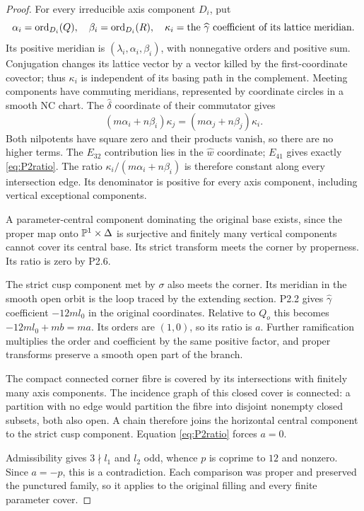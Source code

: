 \begin{proof}
For every irreducible axis component $D_i$, put
\[
 \alpha_i=\operatorname{ord}_{D_i}(Q),\quad\beta_i=\operatorname{ord}_{D_i}(R),\quad
 \kappa_i=\text{the }\widehat\gamma\text{ coefficient of its lattice meridian}.
\]
Its positive meridian is $(\lambda_i,\alpha_i,\beta_i)$, with nonnegative orders and positive sum. Conjugation changes its lattice vector by a vector killed by the first-coordinate covector; thus $\kappa_i$ is independent of its basing path in the complement. Meeting components have commuting meridians, represented by coordinate circles in a smooth NC chart. The $\widehat\delta$ coordinate of their commutator gives
\begin{equation}\label{eq:P2ratio}
 (m\alpha_i+n\beta_i)\kappa_j=(m\alpha_j+n\beta_j)\kappa_i.
\end{equation}
Both nilpotents have square zero and their products vanish, so there are no higher terms. The $E_{32}$ contribution lies in the $\widehat w$ coordinate; $E_{41}$ gives exactly \eqref{eq:P2ratio}. The ratio $\kappa_i/(m\alpha_i+n\beta_i)$ is therefore constant along every intersection edge. Its denominator is positive for every axis component, including vertical exceptional components.

A parameter-central component dominating the original base exists, since the proper map onto $\mathbb P^1\times\Delta$ is surjective and finitely many vertical components cannot cover its central base. Its strict transform meets the corner by properness. Its ratio is zero by P2.6.

The strict cusp component met by $\sigma$ also meets the corner. Its meridian in the smooth open orbit is the loop traced by the extending section. P2.2 gives $\widehat\gamma$ coefficient $-12ml_0$ in the original coordinates. Relative to $Q_o$ this becomes $-12ml_0+mb=ma$. Its orders are $(1,0)$, so its ratio is $a$. Further ramification multiplies the order and coefficient by the same positive factor, and proper transforms preserve a smooth open part of the branch.

The compact connected corner fibre is covered by its intersections with finitely many axis components. The incidence graph of this closed cover is connected: a partition with no edge would partition the fibre into disjoint nonempty closed subsets, both also open. A chain therefore joins the horizontal central component to the strict cusp component. Equation \eqref{eq:P2ratio} forces $a=0$.

Admissibility gives $3\nmid l_1$ and $l_2$ odd, whence $p$ is coprime to $12$ and nonzero. Since $a=-p$, this is a contradiction. Each comparison was proper and preserved the punctured family, so it applies to the original filling and every finite parameter cover.
\end{proof}


